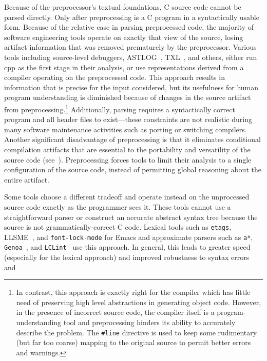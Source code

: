 \documentclass{article}
\newcommand{\Cpp}{\mbox{\textsf{cpp}}}
\newcommand{\C}{\mbox{\textsf{C}}}
\newcommand{\ppd}[1]{\texttt{\##1}}
\begin{document}
Because of the preprocessor's textual foundations, \C{} source code
cannot be parsed directly.  Only after preprocessing is a \C{}
program in a syntactically usable form. Because of the relative ease in
parsing preprocessed code, the majority of software engineering tools
operate on exactly that view of the source, losing artifact information
that was removed prematurely by the preprocessor.  Various tools including
source-level debuggers, ASTLOG~\cite{Crew97}, TXL~\cite{TXL}, and
others, either run \Cpp{} as the first stage in their
analysis, or use representations derived from a compiler operating on
the preprocessed code.  This approach results in information that is
precise for the input considered, but its usefulness for human
program understanding is diminished because of changes in the source
artifact from preprocessing.\footnote{In contrast, this approach is
  exactly right for the compiler which has little need of preserving
  high level abstractions in generating object code.  However, in the
  presence of incorrect source code, the compiler itself is a
  program-understanding tool and preprocessing hinders its ability to
  accurately describe the problem.  The \ppd{line} directive is used to
  keep some rudimentary (but far too coarse) mapping to the original
  source to permit better errors and warnings.}  Additionally,
parsing requires a syntactically correct program and all header files to
exist---these constraints are not realistic during many software
maintenance activities such as porting or switching compilers.
Another significant disadvantage of preprocessing is that it eliminates
conditional compilation artifacts that are essential to the portability
and versatility of the source code (see~\cite{Krone94}).  Preprocessing
forces tools to limit their analysis to a single configuration of the
source code, instead of permitting global reasoning about the entire
artifact.



Some tools choose a different tradeoff and operate instead on the
unprocessed source code exactly as the programmer sees it.  These tools
cannot use a straightforward parser or construct an accurate abstract
syntax tree because the source is not grammatically-correct \C{} code.
Lexical tools such as \texttt{etags}, LLSME~\cite{Murphy95}, and
\texttt{font-lock-mode} for Emacs and approximate parsers such as
\texttt{a*},
\texttt{Genoa}~\cite{Devanbu92}, and \texttt{LCLint}~\cite{LCLint}
use this approach.  In general, this leads to greater speed (especially
for the lexical approach) and improved robustness to syntax errors and
\end{document}
